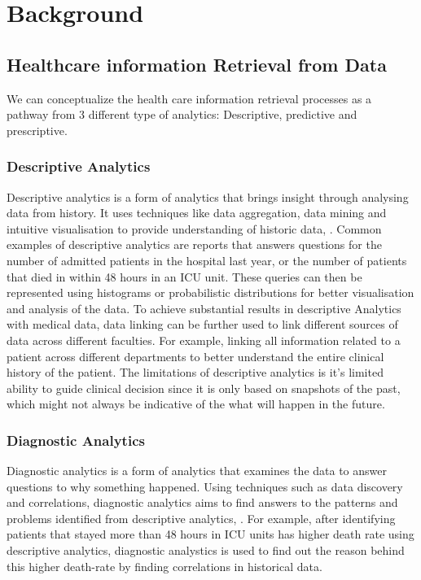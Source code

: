\documentclass{l4proj}
\begin{document}
\chapter{Background}

\section{Healthcare information Retrieval from Data}
We can conceptualize the health care information retrieval processes as a pathway from 3 different type of analytics: Descriptive, predictive and prescriptive. 

\subsection{Descriptive Analytics}
Descriptive analytics is a form of analytics that brings insight through analysing data from history. It uses techniques like data aggregation, data mining and intuitive visualisation to provide understanding of historic data, \cite{healthcareML}. Common examples of descriptive analytics are reports that answers questions for the number of admitted patients in the hospital last year, or the number of patients that died in within 48 hours in an ICU unit. These queries can then be represented using histograms or probabilistic distributions for better visualisation and analysis of the data. To achieve substantial results in descriptive Analytics with medical data, data linking can be further used to link different sources of data across different faculties. For example, linking all information related to a patient across different departments to better understand the entire clinical history of the patient. The limitations of descriptive analytics is it's limited ability to guide clinical decision since it is only based on snapshots of the past, which might not always be indicative of the what will happen in the future. 

\subsection{Diagnostic Analytics}
Diagnostic analytics is a form of analytics that examines the data to answer questions to why something happened. Using techniques such as data discovery and correlations, diagnostic analytics aims to find answers to the patterns and problems identified from descriptive analytics, \cite{healthcareML}. For example, after identifying patients that stayed more than 48 hours in ICU units has higher death rate using descriptive analytics, diagnostic analystics is used to find out the reason behind this higher death-rate by finding correlations in historical data.
\end{document}
